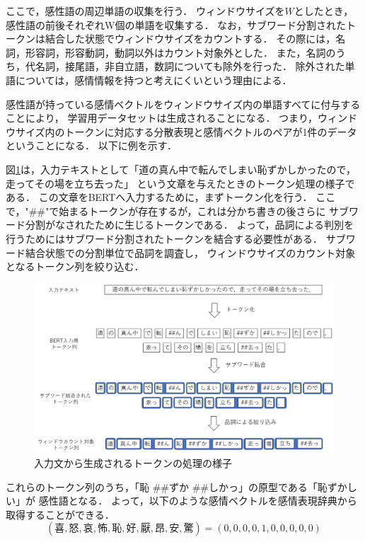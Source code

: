 			ここで，感性語の周辺単語の収集を行う．
			ウィンドウサイズを$W$としたとき，感性語の前後それぞれW個の単語を収集する．
			なお，サブワード分割されたトークンは結合した状態でウィンドウサイズをカウントする．
			その際には，名詞，形容詞，形容動詞，動詞以外はカウント対象外とした．
			また，名詞のうち，代名詞，接尾語，非自立語，数詞についても除外を行った．
			除外された単語については，感情情報を持つと考えにくいという理由による．

			感性語が持っている感情ベクトルをウィンドウサイズ内の単語すべてに付与することにより，
			学習用データセットは生成されることになる．
			つまり，ウィンドウサイズ内のトークンに対応する分散表現と感情ベクトルのペアが1件のデータ
			ということになる．
			以下に例を示す．

			図\ref{fig:token_processing}は，入力テキストとして「道の真ん中で転んでしまい恥ずかしかったので，走ってその場を立ち去った」
			という文章を与えたときのトークン処理の様子である．
			この文章をBERTへ入力するために，まずトークン化を行う．
			ここで，"\#\#"で始まるトークンが存在するが，これは分かち書きの後さらに
			サブワード分割がなされたために生じるトークンである．
			よって，品詞による判別を行うためにはサブワード分割されたトークンを結合する必要性がある．
			サブワード結合状態での分割単位で品詞を調査し，
			ウィンドウサイズのカウント対象となるトークン列を絞り込む．
			\begin{figure}[H]
				\centering
				\includegraphics[width=\linewidth]{./figure/token_processing.png}
				\caption{入力文から生成されるトークンの処理の様子}
				\label{fig:token_processing}
			\end{figure}
			これらのトークン列のうち，「恥 \#\#ずか \#\#しかっ」の原型である「恥ずかしい」が
			感性語となる．
			よって，以下のような感情ベクトルを感情表現辞典から取得することができる．
			$$(喜, 怒, 哀, 怖, 恥, 好, 厭, 昂, 安, 驚)=(0, 0, 0, 0, 1, 0, 0, 0, 0, 0)$$
